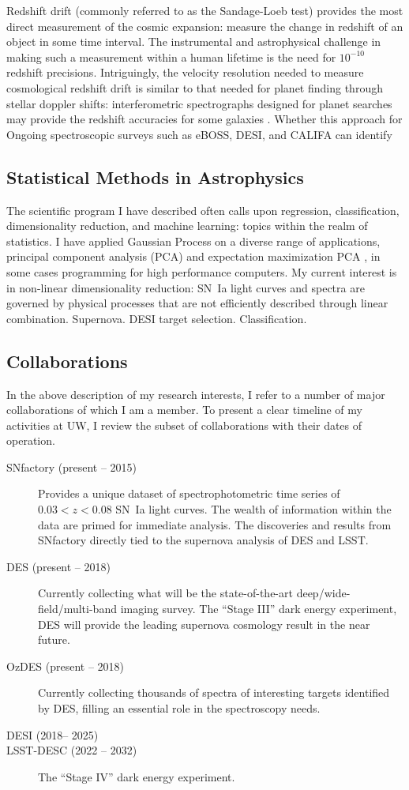 \documentclass{article}
\begin{document}
Redshift drift (commonly referred to as the Sandage-Loeb test) provides the most direct  measurement
of the cosmic expansion: measure the change in redshift of an object in some time interval.  The instrumental
and astrophysical challenge
in making such a measurement within a human lifetime
is the need for $10^{-10}$ redshift precisions.  Intriguingly, the velocity resolution needed to measure
cosmological redshift drift is similar to that needed for planet finding through stellar doppler shifts:
interferometric spectrographs designed for planet searches may provide the redshift accuracies for some galaxies
\cite{drift}.
Whether this approach for 
Ongoing spectroscopic surveys such as eBOSS, DESI, and CALIFA can identify 

\subsection{Statistical Methods in Astrophysics}
The scientific program I have described often calls upon regression, classification, dimensionality reduction,
and machine learning: topics within the realm of statistics.  I have applied Gaussian Process
on a diverse range of applications, principal component
analysis (PCA) and expectation maximization PCA \cite{2012PhRvD..85l3530S,2013ApJ...766...84K,
2013PhRvD..87l3512H}, in some cases programming for high performance computers.
My current interest is in non-linear dimensionality reduction: SN~Ia light curves and spectra
are governed by physical processes that are not efficiently described through linear combination.
Supernova.  DESI target selection.  Classification.

\subsection{Collaborations}
In the above description of my research interests, I refer to a number of major collaborations of which I am a member.  To
present a clear timeline of my  activities at UW, I review the subset of collaborations with their dates of operation.
\begin{description}
\item[SNfactory (present -- 2015)]  Provides a unique dataset of
spectrophotometric time series of $0.03<z<0.08$ SN~Ia light curves.  The wealth of information
within the data are primed for immediate analysis. The discoveries and results from SNfactory directly tied to the supernova
analysis of DES and LSST.
\item[DES (present -- 2018)] Currently collecting what will be the state-of-the-art deep/wide-field/multi-band
imaging survey.   The ``Stage III'' dark energy experiment, DES will provide the leading supernova
cosmology result in the near future.
\item[OzDES (present -- 2018)] Currently collecting thousands of spectra of interesting targets identified by DES,
filling an essential role in the spectroscopy needs.
\item[DESI (2018-- 2025)]
\item[LSST-DESC (2022 -- 2032)]  The ``Stage IV'' dark energy experiment.
\end{description}
\end{document}
